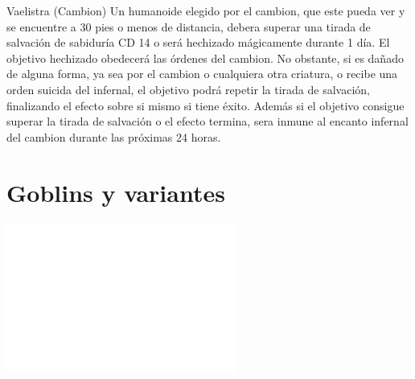 \documentclass[10pt,twoside,twocolumn,openany]{dndbook}
\begin{document}
\begin{DndMonster}[width=\linewidth]{Vaelistra (Cambion)}
  Un humanoide elegido por el cambion, que este pueda ver y se encuentre a 30 pies o menos de 
  distancia, debera superar una tirada de salvación de sabiduría CD 14 o será hechizado 
  mágicamente durante 1 día. El objetivo hechizado obedecerá las órdenes del cambion. No obstante,
  si es dañado de alguna forma, ya sea por el cambion o cualquiera otra criatura, o recibe una 
  orden suicida del infernal, el objetivo podrá repetir la tirada de salvación, finalizando el 
  efecto sobre si mismo si tiene éxito. Además si el objetivo consigue superar la tirada de 
  salvación o el efecto termina, sera inmune al encanto infernal del cambion durante las próximas
  24 horas.


\end{DndMonster}


\chapter*{Goblins y variantes}


\begin{strip}
  \centering
  \includegraphics[width=\textwidth, height=4.9cm]{media/invisible.png}
\end{strip}
\end{document}
